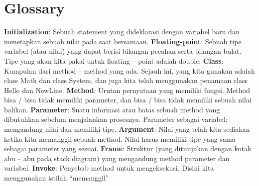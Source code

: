 \section{Glossary}
\textbf{Initialization}: Sebuah statement yang dideklarasi dengan variabel baru dan menetapkan sebuah    nilai pada saat bersamaan.\newline \newline
\textbf{Floating-point}:  Sebuah tipe variabel (atau nilai) yang dapat berisi bilangan pecahan serta bilangan bulat. Tipe yang akan kita pakai untuk floating – point adalah double.\newline \newline
\textbf{Class}: Kumpulan dari method – method yang ada. Sejauh ini, yang kita gunakan adalah class Math dan class System, dan juga kita telah menggunakan penamaan class Hello dan NewLine.\newline \newline
\textbf{Method}: Urutan pernyataan yang memiliki fungsi. Method bisa / bisa tidak memiliki parameter, dan bisa / bisa tidak memiliki sebuah nilai balikan.\newline \newline
\textbf{Parameter}: Suatu informasi atau batas sebuah method yang dibutuhkan sebelum menjalankan prosesnya. Parameter sebagai variabel: mengandung nilai dan memiliki tipe.\newline \newline
\textbf{Argument}: Nilai yang telah kita sediakan ketika kita memanggil sebuah method. Nilai harus memiliki tipe yang sama sebagai parameter yang sesuai.\newline \newline
\textbf{Frame}: Struktur (yang ditunjukan dengan kotak abu – abu pada stack diagram) yang mengandung method parameter dan variabel.\newline \newline
\textbf{Invoke}: Penyebab method untuk mengeksekusi. Disini kita menggunakan istilah “memanggil”

